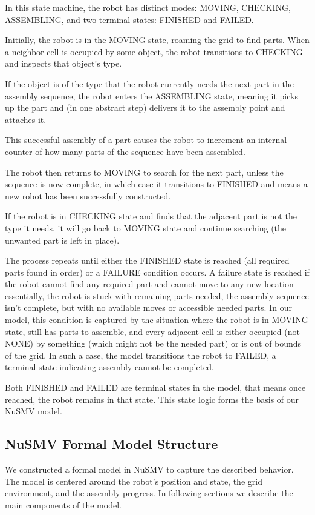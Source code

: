 In this state machine, the robot has distinct modes: MOVING, CHECKING,
ASSEMBLING, and two terminal states: FINISHED and FAILED. 

Initially, the robot is in the MOVING state, roaming the grid to find parts. 
When a neighbor cell is occupied by some object, the robot transitions to 
CHECKING and inspects that object’s type. 

If the object is of the type that the robot currently needs 
the next part in the assembly sequence, the robot enters the ASSEMBLING state,
meaning it picks up the part and 
(in one abstract step) delivers it to the assembly point and attaches it.

This successful assembly of a part causes the robot to increment an 
internal counter of how many parts of the sequence have been assembled. 

The robot then returns to MOVING to search for the next part, unless the 
sequence is now complete, in which case it transitions to FINISHED 
and means a new robot has been successfully constructed. 

If the robot is in CHECKING state and finds that the adjacent part is not the type 
it needs, it will go back to MOVING state and continue searching 
(the unwanted part is left in place). 

The process repeats until either the FINISHED state is reached 
(all required parts found in order) or a FAILURE condition occurs. 
A failure state is reached if the robot cannot 
find any required part and cannot move to any new location -- essentially, 
the robot is stuck with remaining parts needed, the assembly sequence isn't complete,
but with no available moves or accessible needed parts. 
In our model, this condition is captured by the situation where the 
robot is in MOVING state, still has parts to assemble, and every adjacent 
cell is either occupied (not NONE) by something (which might not be 
the needed part) or is out of bounds of the grid. In such a case, 
the model transitions the robot to FAILED, a terminal state indicating assembly 
cannot be completed. 

Both FINISHED and FAILED are terminal states in 
the model, that means once reached, the robot remains in that state. 
This state logic forms the basis of our NuSMV model.

\subsection{NuSMV Formal Model Structure}
\label{ch:globalNusmvStruct}
We constructed a formal model in NuSMV to capture the 
described behavior. The model is centered around the robot's 
position and state, the grid environment, and the assembly progress. 
In following sections we describe the main components of the model.

